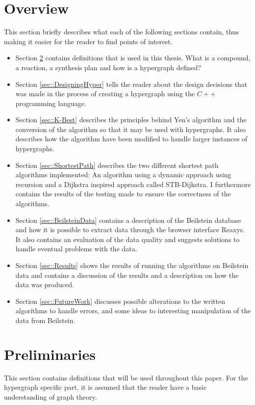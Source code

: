 \documentclass[a4paper,10pt,titlepage]{paper}
\begin{document}
\section{Overview}
This section briefly describes what each of the following sections contain, thus making it easier for the reader to find points of interest.
\begin{itemize}
\item
Section \ref{sec::Preliminaries} contains definitions that is used in this thesis. What is a compound, a reaction, a synthesis plan and how is a hypergraph defined?
\item
Section \ref{sec::DesigningHyper} tells the reader about the design decisions that was made in the process of creating a hypergraph using the $C++$ programming language. 
\item
Section \ref{sec::K-Best} describes the principles behind Yen's algorithm and the conversion of the algorithm so that it may be used with hypergraphs. It also describes how the algorithm have been modified to handle larger instances of hypergraphs.
\item
Section \ref{sec::ShortestPath} describes the two different shortest path algorithms implemented: An algorithm using a dynamic approach using recursion\cite{Carsten} and a Dijkstra inspired approach called STB-Dijkstra\cite{Nielsen}. I furthermore contains the results of the testing made to ensure the correctness of the algorithms.
\item
Section \ref{sec::BeilsteinData} contains a description of the Beilstein database and how it is possible to extract data through the browser interface Reaxys. It also contains an evaluation of the data quality and suggests solutions to handle eventual problems with the data.
\item
Section \ref{sec::Results} shows the results of running the algorithms on Beilstein data and contains a discussion of the results and a description on how the data was produced.
\item 
Section \ref{sec::FutureWork} discusses possible alterations to the written algorithms to handle errors, and some ideas to interesting manipulation of the data from Beilstein.
\end{itemize}

\section{Preliminaries}
\label{sec::Preliminaries}

This section contains definitions that will be used throughout this paper. For the hypergraph specific part, it is assumed that the reader have a basic understanding of graph theory. 
\end{document}
